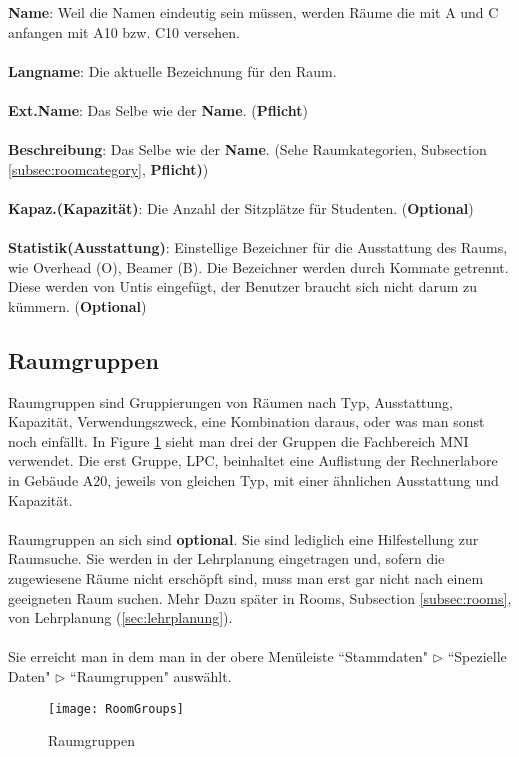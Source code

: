 \documentclass[]{report}
\begin{document}
\noindent
\textbf{Name}: Weil die Namen eindeutig sein müssen, werden Räume die mit A und C anfangen mit A10 bzw. C10 versehen.\\
\\
\textbf{Langname}: Die aktuelle Bezeichnung für den Raum.\\
\\
\textbf{Ext.Name}: Das Selbe wie der \textbf{Name}. (\textbf{Pflicht})\\
\\
\textbf{Beschreibung}: Das Selbe wie der \textbf{Name}. (Sehe Raumkategorien, Subsection  \ref{subsec:roomcategory}, \textbf{Pflicht)})\\
\\
\textbf{Kapaz.(Kapazität)}: Die Anzahl der Sitzplätze für Studenten. (\textbf{Optional})\\
\\
\textbf{Statistik(Ausstattung)}: Einstellige Bezeichner für die Ausstattung des Raums, wie Overhead (O), Beamer (B). Die Bezeichner werden durch Kommate getrennt. Diese werden von Untis eingefügt, der Benutzer braucht sich nicht darum zu kümmern. (\textbf{Optional})\\

\newpage
\subsection{Raumgruppen}

Raumgruppen sind Gruppierungen von Räumen nach Typ, Ausstattung, Kapazität, Verwendungszweck, eine Kombination daraus, oder was man sonst noch einfällt. In Figure \ref{fig:roomgroups} sieht man drei der Gruppen die Fachbereich MNI verwendet. Die erst Gruppe, LPC, beinhaltet eine Auflistung der Rechnerlabore in Gebäude A20, jeweils von gleichen Typ, mit einer ähnlichen Ausstattung und Kapazität.\\
\\
Raumgruppen an sich sind \textbf{optional}. Sie sind lediglich eine Hilfestellung zur Raumsuche. Sie werden in der Lehrplanung eingetragen und, sofern die zugewiesene Räume nicht erschöpft sind, muss man erst gar nicht nach einem geeigneten Raum suchen. Mehr Dazu später in Rooms, Subsection \ref{subsec:rooms}, von Lehrplanung (\ref{sec:lehrplanung}).\\
\\ 
Sie erreicht man in dem man in der obere Menüleiste ``Stammdaten" $\triangleright$ ``Spezielle Daten" $\triangleright$ ``Raumgruppen" auswählt.

\begin{figure}[h]
	\texttt{[image: RoomGroups]}
	\vspace{-15pt}
	\caption{Raumgruppen}
	\label{fig:roomgroups}
\end{figure}
\end{document}
